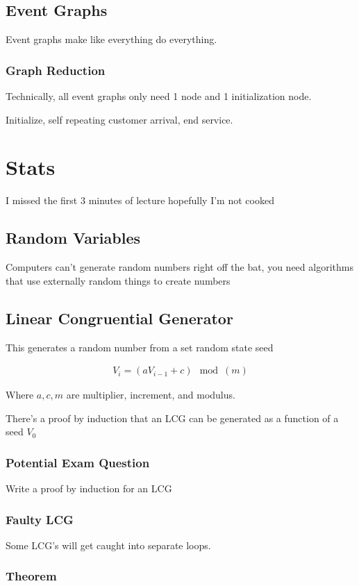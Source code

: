 \documentclass[fleqn]{report}
\newcommand{\equations} [1] {
\begin{gather*}
#1
\end{gather*}
}
\begin{document}
\section{Event Graphs}
Event graphs make like everything do everything. 

\subsection{Graph Reduction}
Technically, all event graphs only need 1 node and 1 initialization node. 

Initialize, self repeating customer arrival, end service. 

\chapter{Stats}
I missed the first 3 minutes of lecture hopefully I'm not cooked 

\section{Random Variables}
Computers can't generate random numbers right off the bat, you need 
algorithms that use externally random things to create numbers 

\section{Linear Congruential Generator}
This generates a random number from a set random state seed 

\equations{
    V_i = (a V_{i-1} + c) \mod(m)
}
Where $a, c, m$ are multiplier, increment, and modulus. 

There's a proof by induction that an LCG can be generated as a function 
of a seed $V_0$ 

\subsection{Potential Exam Question}
Write a proof by induction for an LCG 

\subsection{Faulty LCG}
Some LCG's will get caught into separate loops. 

\subsection{Theorem}
\end{document}
